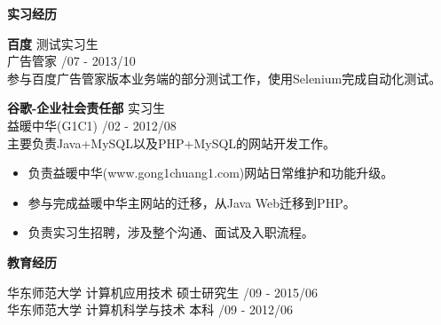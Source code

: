 \documentclass[a4paper]{article}
\newenvironment{changemargin}[2]{%
  \begin{list}{}{%
    \setlength{\topsep}{0pt}%
    \setlength{\leftmargin}{#1}%
    \setlength{\rightmargin}{#2}%
    \setlength{\listparindent}{\parindent}%
    \setlength{\itemindent}{\parindent}%
    \setlength{\parsep}{\parskip}%
  }%
  \item[]}{\end{list}
}
\newcommand{\lineover}{
	\begin{changemargin}{-0.05in}{-0.05in}
		\vspace*{-8pt}
		\hrulefill \\
		\vspace*{-2pt}
	\end{changemargin}
}
\newcommand{\header}[1]{
	\begin{changemargin}{-0.5in}{-0.5in}
		\scshape{\textbf{#1}}\\
	\end{changemargin}
}
\newenvironment{body} {
	\vspace*{-16pt}
	\begin{changemargin}{-0.25in}{-0.5in}
  }	
	{\end{changemargin}
}
\begin{document}
\medskip


\header{实习经历}

\begin{body}
	\vspace{14pt}
	\textbf{百度} \hfill 测试实习生\\ 
	广告管家 \hfill {/07 - 2013/10}\\ 
	参与百度广告管家{}版本业务端的部分测试工作，使用{\fontarial Selenium}完成自动化测试。

	\vspace{6pt}
	\textbf{谷歌-企业社会责任部} \hfill 实习生\\ 
	益暖中华{\fontarial (G1C1)} \hfill {/02 - 2012/08}\\ 
	主要负责{\fontarial Java+MySQL}以及{\fontarial PHP+MySQL}的网站开发工作。\\ 
	\vspace*{-6pt}
	\begin{itemize} \itemsep -0pt  %
		\item 负责益暖中华{\fontarial(www.gong1chuang1.com)}网站日常维护和功能升级。\\
	\end{itemize}
	\vspace*{-12pt}
	\begin{itemize} \itemsep -0pt  %
		\item 参与完成益暖中华主网站的迁移，从{\fontarial Java Web}迁移到{\fontarial PHP}。\\
	\end{itemize}
	\vspace*{-12pt}
	\begin{itemize} \itemsep -0pt  %
		\item 负责实习生招聘，涉及整个沟通、面试及入职流程。\\
	\end{itemize}
\end{body}

\medskip

\header{教育经历}

\begin{body}
	\vspace{14pt}
	{华东师范大学 计算机应用技术 硕士研究生} \hfill {/09 - 2015/06} \\
	{华东师范大学 计算机科学与技术 本科} \hfill {/09 - 2012/06} \\
\end{body}
\end{document}
